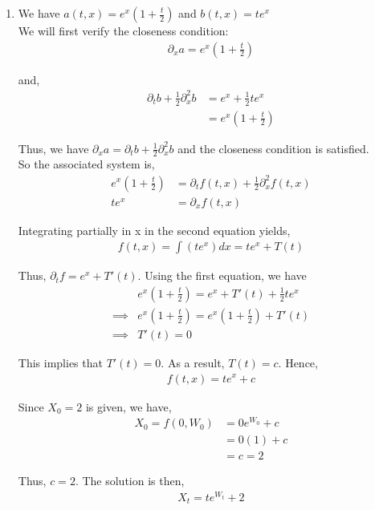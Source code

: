 \documentclass[12pt]{article}
\begin{document}
\begin{enumerate}[\alph*)]
\item We have $a(t,x) = e^x(1 + \frac{t}{2})$ and $b(t,x) = te^x$\\

We will first verify the closeness condition:
\begin{align*}
\partial_x a = e^x(1 + \frac{t}{2})
\end{align*}

and,
\begin{align*}
\partial_t b + \frac{1}{2} \partial_x^2 b &= e^x + \frac{1}{2}te^x\\
&= e^x(1 + \frac{t}{2})
\end{align*}

Thus, we have $\partial_x a = \partial_t b + \frac{1}{2} \partial_x^2 b$ and the closeness condition is satisfied.\\

So the associated system is,
\begin{align*}
e^x(1 + \frac{t}{2}) &= \partial_t f(t,x) + \frac{1}{2} \partial_x^2 f(t,x)\\
te^x &= \partial_x f(t,x)
\end{align*}

Integrating partially in x in the second equation yields,
\begin{align*}
f(t,x) = \int (te^x) dx = te^x + T(t)
\end{align*}

Thus, $\partial_t f = e^x + T'(t)$. Using the first equation, we have
\begin{align*}
&e^x(1 + \frac{t}{2}) = e^x + T'(t) + \frac{1}{2}te^x\\
\implies &e^x(1 + \frac{t}{2}) = e^x(1 + \frac{t}{2}) + T'(t)\\
\implies &T'(t) = 0
\end{align*}

This implies that $T'(t) = 0$. As a result, $T(t) = c$. Hence,
\begin{align*}
f(t,x) = te^x + c
\end{align*}

Since $X_0 = 2$ is given, we have,
\begin{align*}
X_0 = f(0, W_0) &= 0e^{W_0} + c\\
&= 0(1) + c\\
&= c = 2
\end{align*}

Thus, $c = 2$. The solution is then,
\begin{align*}
X_t = te^{W_t} + 2
\end{align*}

\end{enumerate}
\end{document}
